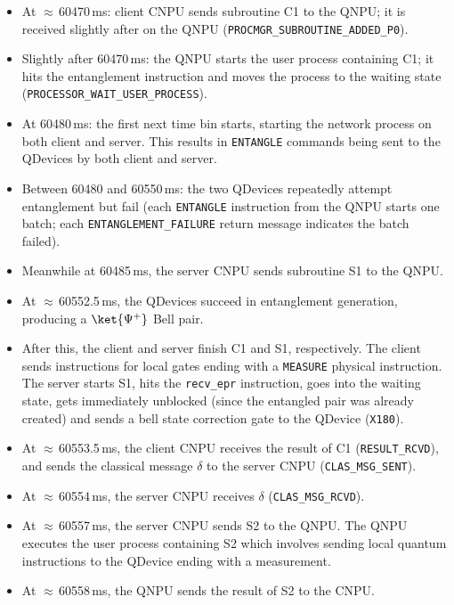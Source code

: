 \begin{itemize}
    \item At $\approx$\,60470\,ms: client \ac{CNPU} sends subroutine C1 to the \ac{QNPU}; it is received slightly after on the \ac{QNPU} (\texttt{PROCMGR\_SUBROUTINE\_ADDED\_P0}).
    \item Slightly after 60470\,ms: the \ac{QNPU} starts the user process containing C1; it hits the entanglement instruction and moves the process to the waiting state (\texttt{PROCESSOR\_WAIT\_USER\_PROCESS}).
    \item At 60480\,ms: the first next time bin starts, starting the network process on both client and server. This results in \texttt{ENTANGLE} commands being sent to the \acp{QDevice} by both client and server.
    \item Between 60480 and 60550\,ms: the two \acp{QDevice} repeatedly attempt entanglement but fail (each \texttt{ENTANGLE} instruction from the \ac{QNPU} starts one batch; each \texttt{ENTANGLEMENT\_FAILURE} return message indicates the batch failed).
    \item Meanwhile at 60485\,ms, the server \ac{CNPU} sends subroutine S1 to the \ac{QNPU}.
    \item At $\approx$\,60552.5\,ms, the \acp{QDevice} succeed in entanglement generation, producing a $\ket{\Psi^+}$ Bell pair.
    \item After this, the client and server finish C1 and S1, respectively. The client sends instructions for local gates ending with a \texttt{MEASURE} physical instruction. The server starts S1, hits the \texttt{recv\_epr} instruction, goes into the waiting state, gets immediately unblocked (since the entangled pair was already created) and sends a bell state correction gate to the \ac{QDevice} (\texttt{X180}).
    \item At $\approx$\,60553.5\,ms, the client \ac{CNPU} receives the result of C1 (\texttt{RESULT\_RCVD}), and sends the classical message $\delta$ to the server \ac{CNPU} (\texttt{CLAS\_MSG\_SENT}).
    \item At $\approx$\,60554\,ms, the server \ac{CNPU} receives $\delta$ (\texttt{CLAS\_MSG\_RCVD}).
    \item At $\approx$\,60557\,ms, the server \ac{CNPU} sends S2 to the \ac{QNPU}. The \ac{QNPU} executes the user process containing S2 which involves sending local quantum instructions to the \ac{QDevice} ending with a measurement.
    \item At $\approx$\,60558\,ms, the \ac{QNPU} sends the result of S2 to the \ac{CNPU}.
\end{itemize}

